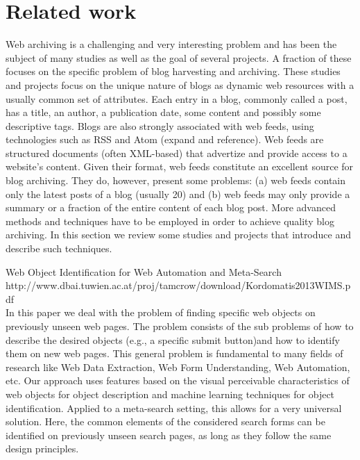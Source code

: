 \section{Related work}

Web archiving is a challenging and very interesting problem and has been the subject of many studies as well as the goal of several projects.
A fraction of these focuses on the specific problem of blog harvesting and archiving.
These studies and projects focus on the unique nature of blogs as dynamic web resources with a usually common set of attributes.
Each entry in a blog, commonly called a post, has a title, an author, a publication date, some content and possibly some descriptive tags.
Blogs are also strongly associated with web feeds, using technologies such as RSS and Atom (expand and reference).
Web feeds are structured documents (often XML-based) that advertize and provide access to a website's content.
Given their format, web feeds constitute an excellent source for blog archiving.
They do, however, present some problems: (a) web feeds contain only the latest posts of a blog (usually 20) and (b) web feeds may only provide a summary or a fraction of the entire content of each blog post.
More advanced methods and techniques have to be employed in order to achieve quality blog archiving.
In this section we review some studies and projects that introduce and describe such techniques.


Web Object Identification for Web Automation and Meta-Search\\
http://www.dbai.tuwien.ac.at/proj/tamcrow/download/Kordomatis2013WIMS.pdf\\
In this paper we deal with the problem of finding specific web objects on previously unseen web pages. The problem consists of the sub problems of how to describe the desired objects (e.g., a specific submit button)and how to identify them on new web pages. This general problem is fundamental to many fields of research like Web Data Extraction, Web Form Understanding, Web Automation, etc.
Our approach uses features based on the visual perceivable  characteristics of web objects for object description and machine learning techniques for object identification. Applied to a meta-search setting, this allows for a very universal solution. Here, the common elements of the considered search forms can be identified on previously unseen search pages, as long as they follow the same design principles.

